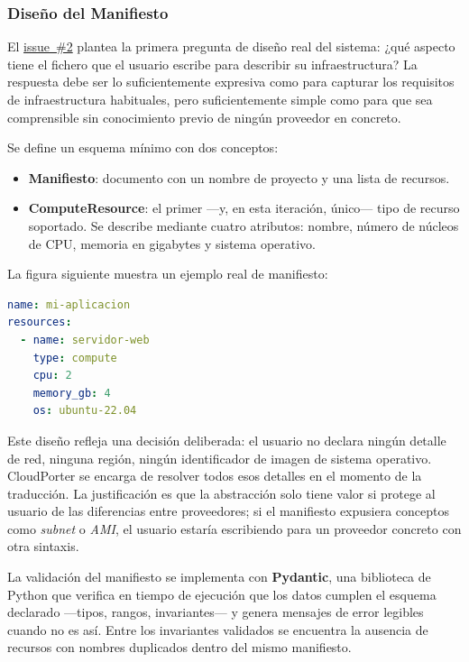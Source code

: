 \subsubsection{Diseño del Manifiesto}

El \href{https://github.com/lucpez/cloudporter/issues/2}{issue~\#2} plantea la primera pregunta de diseño real del sistema: ¿qué aspecto tiene el
fichero que el usuario escribe para describir su infraestructura? La respuesta debe ser lo
suficientemente expresiva como para capturar los requisitos de infraestructura habituales,
pero suficientemente simple como para que sea comprensible sin conocimiento previo de ningún
proveedor en concreto.

Se define un esquema mínimo con dos conceptos:

\begin{itemize}
    \item \textbf{Manifiesto}: documento con un nombre de proyecto y una lista de recursos.
    \item \textbf{ComputeResource}: el primer —y, en esta iteración, único— tipo de recurso
    soportado. Se describe mediante cuatro atributos: nombre, número de núcleos de CPU,
    memoria en gigabytes y sistema operativo.
\end{itemize}

La figura siguiente muestra un ejemplo real de manifiesto:

\begin{lstlisting}[language=yaml, caption={Ejemplo de manifiesto CloudPorter para un servidor web sencillo.}, label={lst:manifest}]
name: mi-aplicacion
resources:
  - name: servidor-web
    type: compute
    cpu: 2
    memory_gb: 4
    os: ubuntu-22.04
\end{lstlisting}

Este diseño refleja una decisión deliberada: el usuario no declara ningún detalle de red,
ninguna región, ningún identificador de imagen de sistema operativo. CloudPorter se encarga
de resolver todos esos detalles en el momento de la traducción. La justificación es que la
abstracción solo tiene valor si protege al usuario de las diferencias entre proveedores; si
el manifiesto expusiera conceptos como \textit{subnet} o \textit{AMI}, el usuario estaría
escribiendo para un proveedor concreto con otra sintaxis.

La validación del manifiesto se implementa con \textbf{Pydantic}, una biblioteca de Python
que verifica en tiempo de ejecución que los datos cumplen el esquema declarado —tipos,
rangos, invariantes— y genera mensajes de error legibles cuando no es así. Entre los
invariantes validados se encuentra la ausencia de recursos con nombres duplicados dentro
del mismo manifiesto.

